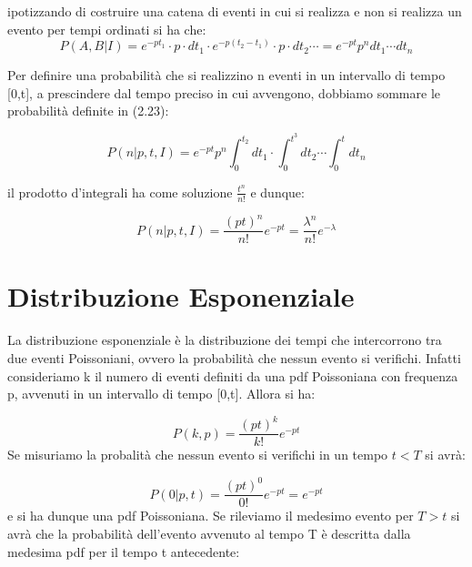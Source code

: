 ipotizzando di costruire una catena di eventi in cui si realizza e non si realizza un evento per tempi ordinati si ha che:
\begin{equation}
	P(A,B \vert I) = e^{-pt_1} \cdot p \cdot dt_1 \cdot e^{-p(t_2-t_1)} \cdot p \cdot dt_2 \cdots = e^{-pt}p^ndt_1 \cdots dt_n
\end{equation}

Per definire una probabilit\`{a} che si realizzino n eventi in un intervallo di tempo [0,t], a prescindere dal tempo preciso in cui avvengono, dobbiamo sommare le probabilit\`{a} definite in (2.23):

\begin{equation}
	P(n \vert p,t,I) = e^{-pt}p^n \int_0^{t_2}dt_{1} \cdot \int_{0}^{t^3}dt_{2} \cdots \int_{0}^{t}dt_n
\end{equation}

il prodotto d'integrali ha come soluzione $\frac{t^n}{n!}$ e dunque:

\begin{equation}
	P(n \vert p,t,I) = \dfrac{(pt)^n}{n!}e^{-pt} = \dfrac{\lambda^n}{n!}e^{-\lambda}
\end{equation} 

\section{Distribuzione Esponenziale}

La distribuzione esponenziale \`{e} la distribuzione dei tempi che intercorrono tra due eventi Poissoniani, ovvero la probabilit\`{a} che nessun evento si verifichi. Infatti consideriamo k il numero di eventi definiti da una pdf Poissoniana con frequenza p, avvenuti in un intervallo di tempo [0,t]. Allora si ha:

\begin{equation*}
	P(k,p) = \dfrac{(pt)^k}{k!}e^{-pt}
\end{equation*}
\newline
 Se misuriamo la probalit\`{a} che nessun evento si verifichi in un tempo $t < T$ si avr\`{a}:

\begin{equation*}
	P(0 \vert p,t) = \dfrac{(pt)^0}{0!}e^{-pt} = e^{-pt}
\end{equation*}
\newline
 e si ha dunque una pdf Poissoniana. Se rileviamo il medesimo evento per $T > t$ si avr\`{a} che la probabilit\`{a} dell'evento avvenuto al tempo T \`{e} descritta dalla medesima pdf per il tempo t antecedente:

